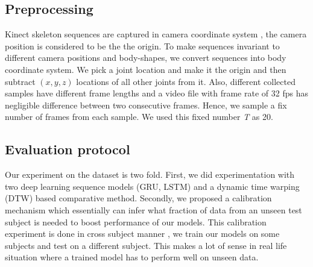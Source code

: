 \documentclass[10pt,twocolumn,letterpaper]{article}
\begin{document}
\subsection{Preprocessing}
Kinect skeleton sequences are 
captured in camera coordinate system \ie, the 
camera position is considered to be the
the origin. To make sequences invariant to different 
camera positions and body-shapes, we convert sequences 
into body coordinate system. We pick a joint location 
and make it the 
origin and then  subtract $(x, y, z)$ locations of all
other joints from it. Also, different collected samples have
different frame lengths and a video file with frame rate of 32 fps has negligible difference between two consecutive frames. Hence, we sample 
a fix number of frames from each sample. We used this fixed number \textit{T} as  20. 



\subsection{Evaluation protocol}
\label{sec:ev_prot}
Our experiment on the dataset is two fold. First, we did experimentation 
with two deep learning sequence models (GRU, LSTM)  and a dynamic time warping (DTW) based comparative method. Secondly, we proposed a calibration mechanism which essentially can infer what fraction of data from an unseen test subject is needed to boost performance of our models. This calibration experiment is done in cross subject manner \eg, we train our models on some subjects and test on a different subject. This makes a lot of sense in real life situation where a trained model has to perform well on unseen data. 


\end{document}
